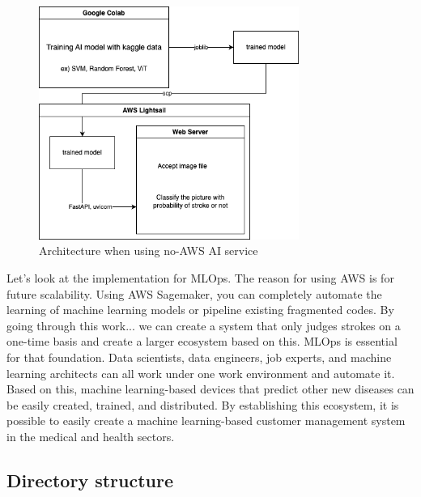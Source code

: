 \begin{figure}[h]
    \centering
    \includegraphics[width=8.5cm]{images/ai-back.drawio (1).png}
    \caption{Architecture when using no-AWS AI service}
\end{figure}


Let's look at the implementation for MLOps. The reason for using AWS is for future scalability. Using AWS Sagemaker, you can completely automate the learning of machine learning models or pipeline existing fragmented codes. By going through this work... we can create a system that only judges strokes on a one-time basis and create a larger ecosystem based on this. MLOps is essential for that foundation. Data scientists, data engineers, job experts, and machine learning architects can all work under one work environment and automate it. Based on this, machine learning-based devices that predict other new diseases can be easily created, trained, and distributed. By establishing this ecosystem, it is possible to easily create a machine learning-based customer management system in the medical and health sectors.


\subsection{Directory structure}

